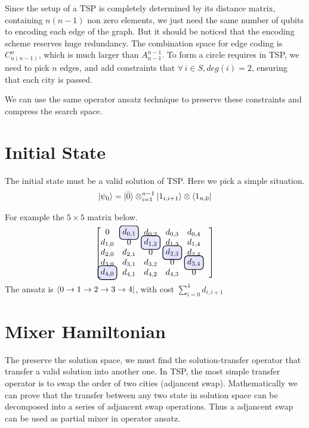 \documentclass[a4paper, amsfonts, amssymb, amsmath, reprint, showkeys, nofootinbib, twoside]{revtex4-1}
\newcommand\hlight[1]{\tikz[overlay, remember picture,baseline=-\the\dimexpr\fontdimen22\textfont2\relax]\node[rectangle,fill=blue!50,rounded corners,fill opacity = 0.2,draw,thick,text opacity =1] {$#1$};}
\begin{document}
Since the setup of a TSP is completely determined by its distance matrix, containing $n(n-1)$ non zero elements, we just need the same number of qubits to encoding each edge of the graph. But it should be noticed that the encoding scheme reserves huge redundancy. The combination space for edge coding is $C_{n(n-1)}^n$, which is much larger than $A_{n-1}^{n-1}$. To form a circle requires in TSP, we need to pick $n$ edges, and add constraints that $\forall\, i\in S, deg(i)=2$, ensuring that each city is passed. 

We can use the same operator ansatz technique to preserve these constraints and compress the search space.

\section{Initial State}
The initial state must be a valid solution of TSP. Here we pick a simple situation. 
$$
|\psi_0\rangle=|\bar 0\rangle \otimes_{i=1}^{n-1} |1_{i,i+1}\rangle\otimes\bra{1_{n,0}}
$$

For example the $5\times 5$ matrix below.
$$
\begin{bmatrix}
    0&\hlight{d_{0,1}}&d_{0,2}&d_{0,3}&d_{0,4}&\\
    d_{1,0}&0&\hlight{d_{1,2}}&d_{1,3}&d_{1,4}&\\
    d_{2,0}&d_{2,1}&0&\hlight{d_{2,3}}&d_{2,4}&\\
    d_{3,0}&d_{3,1}&d_{3,2}&0&\hlight{d_{3,4}}&\\
    \hlight{d_{4,0}}&d_{4,1}&d_{4,2}&d_{4,3}&0&\\
\end{bmatrix}
$$
The ansatz is $\bra{0\rightarrow 1 \rightarrow 2\rightarrow 3\rightarrow 4}$, with cost $\sum_{i=0}^4 d_{i,i+1}$


\section{Mixer Hamiltonian}
The preserve the solution space, we must find the solution-transfer operator that transfer a valid solution into another one. In TSP, the most simple transfer operator is to swap the order of two cities (adjancent swap). Mathematically we can prove that the transfer between any two state in solution space can be decomposed into a series of adjancent swap operations. Thus a adjancent swap can be used as partial mixer in operator ansatz.
\end{document}
